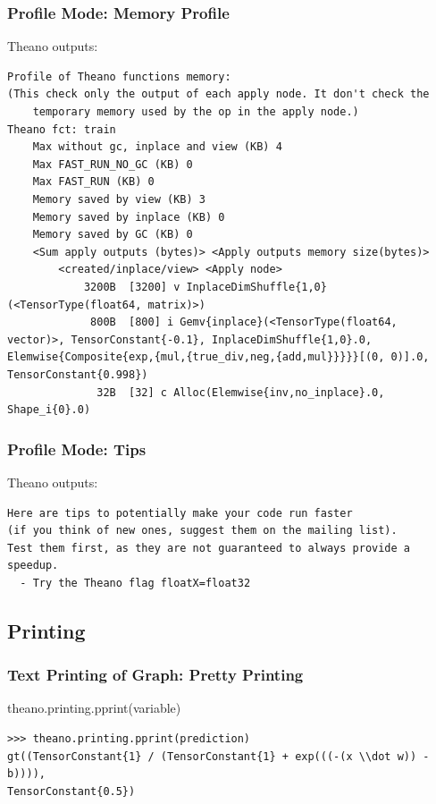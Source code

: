 \documentclass[a4paper,9pt]{beamer}
\begin{document}
\begin{frame}[fragile]
\frametitle{Profile Mode: Memory Profile}
Theano outputs:
\vfill
\begin{Verbatim}
Profile of Theano functions memory:
(This check only the output of each apply node. It don't check the 
    temporary memory used by the op in the apply node.)
Theano fct: train
    Max without gc, inplace and view (KB) 4
    Max FAST_RUN_NO_GC (KB) 0
    Max FAST_RUN (KB) 0
    Memory saved by view (KB) 3
    Memory saved by inplace (KB) 0
    Memory saved by GC (KB) 0
    <Sum apply outputs (bytes)> <Apply outputs memory size(bytes)> 
        <created/inplace/view> <Apply node>
            3200B  [3200] v InplaceDimShuffle{1,0}(<TensorType(float64, matrix)>)
             800B  [800] i Gemv{inplace}(<TensorType(float64, vector)>, TensorConstant{-0.1}, InplaceDimShuffle{1,0}.0, Elemwise{Composite{exp,{mul,{true_div,neg,{add,mul}}}}}[(0, 0)].0, TensorConstant{0.998})
              32B  [32] c Alloc(Elemwise{inv,no_inplace}.0, Shape_i{0}.0)
\end{Verbatim}
\end{frame}

\begin{frame}[fragile]
\frametitle{Profile Mode: Tips}
Theano outputs:
\vfill
\begin{Verbatim}
Here are tips to potentially make your code run faster
(if you think of new ones, suggest them on the mailing list).
Test them first, as they are not guaranteed to always provide a speedup.
  - Try the Theano flag floatX=float32
\end{Verbatim}
\end{frame}

\subsection{Printing}
\begin{frame}[fragile]
\frametitle{Text Printing of Graph: Pretty Printing}
theano.printing.pprint(variable)
\vfill
\begin{Verbatim}
>>> theano.printing.pprint(prediction)
gt((TensorConstant{1} / (TensorConstant{1} + exp(((-(x \\dot w)) - b)))),
TensorConstant{0.5})
\end{Verbatim}
\end{frame}
\end{document}
